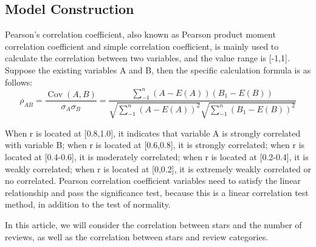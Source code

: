 \documentclass[../mcmpaper]{subfiles}
\begin{document}
    \subsection{Model Construction}
    Pearson's correlation coefficient, also known as Pearson product moment correlation coefficient and simple correlation coefficient\cite{8}, is mainly used to calculate the correlation between two variables, and the value range is [-1,1]. Suppose the existing variables A and B, then the specific calculation formula is as follows:
    \begin{equation}
    \rho_{A B}=\frac{\operatorname{Cov}(A, B)}{\sigma_{A} \sigma_{B}}=\frac{\sum_{-1}^{n}(A-E(A))\left(B_{1}-E(B)\right)}{\sqrt{\sum_{-1}^{n}(A-E(A))^{2}} \sqrt{\sum_{-1}^{n}\left(B_{1}-E(B)\right)^{2}}}
    \end{equation}
    \par
    When r is located at [0.8,1.0], it indicates that variable A is strongly correlated with variable B; when r is located at [0.6,0.8], it is strongly correlated; when r is located at [0.4-0.6], it is moderately correlated; when r is located at [0.2-0.4], it is weakly correlated; when r is located at [0,0.2], it is extremely weakly correlated or no correlated. Pearson correlation coefficient variables need to satisfy the linear relationship and pass the significance test, because this is a linear correlation test method, in addition to the test of normality.
    \par
    In this article, we will consider the correlation between stars and the number of reviews, as well as the correlation between stars and review categories.
\end{document}
